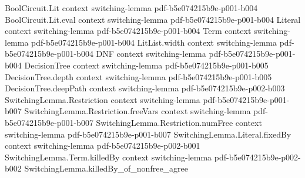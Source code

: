 \begin{lemma}
\label{SwitchingLemma.go_roundtrip_gen}
\leanok
{}
\proofstep
  {BoolCircuit.Lit}
  {context}
  {switching-lemma}
  {pdf-b5e074215b9e-p001-b004}
\proofstep
  {BoolCircuit.Lit.eval}
  {context}
  {switching-lemma}
  {pdf-b5e074215b9e-p001-b004}
\proofstep
  {Literal}
  {context}
  {switching-lemma}
  {pdf-b5e074215b9e-p001-b004}
\proofstep
  {Term}
  {context}
  {switching-lemma}
  {pdf-b5e074215b9e-p001-b004}
\proofstep
  {LitList.width}
  {context}
  {switching-lemma}
  {pdf-b5e074215b9e-p001-b004}
\proofstep
  {DNF}
  {context}
  {switching-lemma}
  {pdf-b5e074215b9e-p001-b004}
\proofstep
  {DecisionTree}
  {context}
  {switching-lemma}
  {pdf-b5e074215b9e-p001-b005}
\proofstep
  {DecisionTree.depth}
  {context}
  {switching-lemma}
  {pdf-b5e074215b9e-p001-b005}
\proofstep
  {DecisionTree.deepPath}
  {context}
  {switching-lemma}
  {pdf-b5e074215b9e-p002-b003}
\proofstep
  {SwitchingLemma.Restriction}
  {context}
  {switching-lemma}
  {pdf-b5e074215b9e-p001-b007}
\proofstep
  {SwitchingLemma.Restriction.freeVars}
  {context}
  {switching-lemma}
  {pdf-b5e074215b9e-p001-b007}
\proofstep
  {SwitchingLemma.Restriction.numFree}
  {context}
  {switching-lemma}
  {pdf-b5e074215b9e-p001-b007}
\proofstep
  {SwitchingLemma.Literal.fixedBy}
  {context}
  {switching-lemma}
  {pdf-b5e074215b9e-p002-b001}
\proofstep
  {SwitchingLemma.Term.killedBy}
  {context}
  {switching-lemma}
  {pdf-b5e074215b9e-p002-b002}
\proofstep
  {SwitchingLemma.killedBy_of_nonfree_agree}

\end{lemma}
